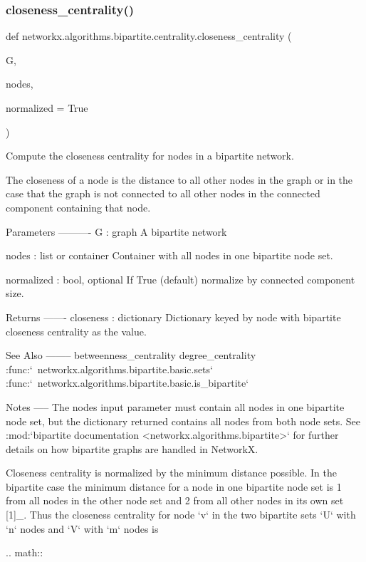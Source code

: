 \subsubsection{\texorpdfstring{closeness\+\_\+centrality()}{closeness\_centrality()}}
{\footnotesize\ttfamily def networkx.\+algorithms.\+bipartite.\+centrality.\+closeness\+\_\+centrality (\begin{DoxyParamCaption}\item[{}]{G,  }\item[{}]{nodes,  }\item[{}]{normalized = {\ttfamily True} }\end{DoxyParamCaption})}

\begin{DoxyVerb}Compute the closeness centrality for nodes in a bipartite network.

The closeness of a node is the distance to all other nodes in the
graph or in the case that the graph is not connected to all other nodes
in the connected component containing that node.

Parameters
----------
G : graph
    A bipartite network

nodes : list or container
    Container with all nodes in one bipartite node set.

normalized : bool, optional
  If True (default) normalize by connected component size.

Returns
-------
closeness : dictionary
    Dictionary keyed by node with bipartite closeness centrality
    as the value.

See Also
--------
betweenness_centrality
degree_centrality
:func:`~networkx.algorithms.bipartite.basic.sets`
:func:`~networkx.algorithms.bipartite.basic.is_bipartite`

Notes
-----
The nodes input parameter must contain all nodes in one bipartite node set,
but the dictionary returned contains all nodes from both node sets.
See :mod:`bipartite documentation <networkx.algorithms.bipartite>`
for further details on how bipartite graphs are handled in NetworkX.


Closeness centrality is normalized by the minimum distance possible.
In the bipartite case the minimum distance for a node in one bipartite
node set is 1 from all nodes in the other node set and 2 from all
other nodes in its own set [1]_. Thus the closeness centrality
for node `v`  in the two bipartite sets `U` with
`n` nodes and `V` with `m` nodes is

.. math::


\end{DoxyVerb}
